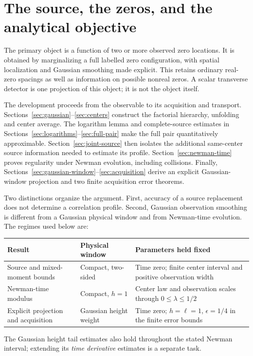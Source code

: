 \section{The source, the zeros, and the analytical objective}\label{sec:framework}

The primary object is a function of two or more observed zero locations.
It is obtained by marginalizing a full labelled zero configuration, with
spatial localization and Gaussian smoothing made explicit. This retains
ordinary real-zero spacings as well as information on possible nonreal
zeros. A scalar transverse detector is one projection of this object;
it is not the object itself.

The development proceeds from the observable to its acquisition and
transport. Sections~\ref{sec:gaussian}--\ref{sec:centers} construct the
factorial hierarchy, unfolding and center average. The logarithm lemma
and complete-source estimates in Sections~\ref{sec:logarithms}--\ref{sec:full-pair}
make the full pair quantitatively approximable. Section~\ref{sec:joint-source}
then isolates the additional same-center source information needed to
estimate its profile. Section~\ref{sec:newman-time} proves regularity
under Newman evolution, including collisions. Finally,
Sections~\ref{sec:gaussian-window}--\ref{sec:acquisition} derive an explicit
Gaussian-window projection and two finite acquisition error theorems.

Two distinctions organize the argument. First, accuracy of a source
replacement does not determine a correlation profile. Second, Gaussian
observation smoothing is different from a Gaussian physical window and
from Newman-time evolution. The regimes used below are:
\begin{center}\small
\begin{tabularx}{\textwidth}{@{}lYY@{}}
\toprule
Result & Physical window & Parameters held fixed\\
\midrule
Source and mixed-moment bounds & Compact, two-sided & Time zero; finite
center interval and positive observation width\\
Newman-time modulus & Compact, $h=1$ & Center law and observation scales
through $0\le\lambda\le1/2$\\
Explicit projection and acquisition & Gaussian height weight & Time zero;
$h=\ell=1$, $\epsilon=1/4$ in the finite error bounds\\
\bottomrule
\end{tabularx}
\end{center}
The Gaussian height tail estimates also hold throughout the stated
Newman interval; extending its \emph{time derivative} estimates is a
separate task.

